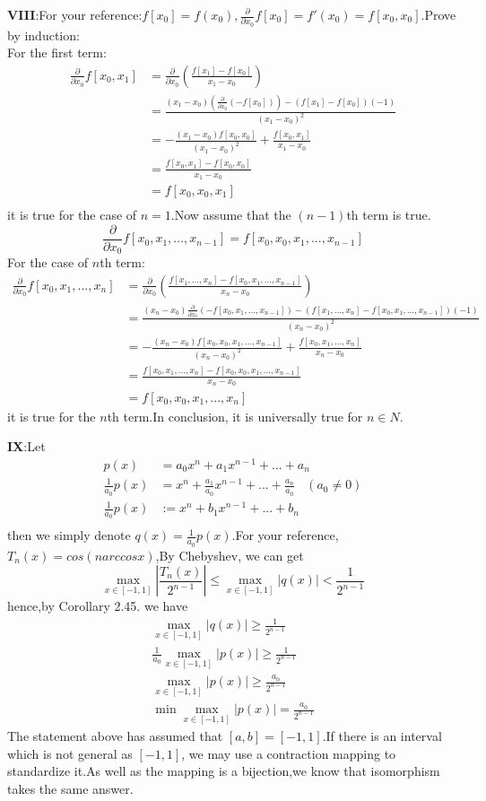 \documentclass{ctexart}
\begin{document}
\textbf{VIII}:For your reference:$f[x_0]=f(x_0),\frac{\partial}{\partial x_0}f[x_0]=f'(x_0)=f[x_0,x_0]$.Prove by induction:\\
For the first term:
\begin{align*}
    \frac{\partial}{\partial x_0}f[x_0,x_1]&=\frac{\partial}{\partial x_0}(\frac{f[x_1]-f[x_0]}{x_1-x_0})\\
    &=\frac{(x_1-x_0)(\frac{\partial}{\partial x_0}(-f[x_0]))-(f[x_1]-f[x_0])(-1)}{(x_1-x_0)^2}\\
    &=-\frac{(x_1-x_0)f[x_0,x_0]}{(x_1-x_0)^2}+\frac{f[x_0,x_1]}{x_1-x_0}\\
    &=\frac{f[x_0,x_1]-f[x_0,x_0]}{x_1-x_0}\\
    &=f[x_0,x_0,x_1]\\
\end{align*}
it is true for the case of $n=1$.Now assume that the $(n-1)$th term is true.
$$\frac{\partial}{\partial x_0}f[x_0,x_1,...,x_{n-1}]=f[x_0,x_0,x_1,...,x_{n-1}]$$
For the case of $n$th term:
\begin{align*}
    \frac{\partial}{\partial x_0}f[x_0,x_1,...,x_n]&=\frac{\partial}{\partial x_0}(\frac{f[x_1,...,x_n]-f[x_0,x_1,...,x_{n-1}]}{x_n-x_0})\\
    &=\frac{(x_n-x_0)\frac{\partial}{\partial x_0}(-f[x_0,x_1,...,x_{n-1}])-(f[x_1,...,x_n]-f[x_0,x_1,...,x_{n-1}])(-1)}{(x_n-x_0)^2}\\
    &=-\frac{(x_n-x_0)f[x_0,x_0,x_1,...,x_{n-1}]}{(x_n-x_0)^2}+\frac{f[x_0,x_1,...,x_n]}{x_n-x_0}\\
    &=\frac{f[x_0,x_1,...,x_n]-f[x_0,x_0,x_1,...,x_{n-1}]}{x_n-x_0}\\
    &=f[x_0,x_0,x_1,...,x_n]
\end{align*}
it is true for the $n$th term.In conclusion, it is universally true for $n \in N$.

\textbf{IX}:Let 
\begin{align*}
    p(x)&=a_0x^n+a_1x^{n-1}+...+a_n\\
    \frac{1}{a_0}p(x)&=x^n+\frac{a_1}{a_0}x^{n-1}+...+\frac{a_n}{a_0} \>\>\>\>(a_0 \neq 0)\\
    \frac{1}{a_0}p(x)&:=x^n+b_1x^{n-1}+...+b_n\\
\end{align*}
then we simply denote $q(x)=\frac{1}{a_0}p(x)$.For your reference, $T_n(x)=cos(n arccos x)$,By Chebyshev, we can get 
$$\max_{x \in [-1,1]} |\frac{T_n(x)}{2^{n-1}}| \leq \max_{x \in [-1,1]} |q(x)|<\frac{1}{2^{n-1}}$$
hence,by Corollary 2.45. we have 
\begin{align*}
    \max_{x \in [-1,1]} |q(x)| \geq \frac{1}{2^{n-1}}\\
    \frac{1}{a_0}\max_{x \in [-1,1]} |p(x)| \geq \frac{1}{2^{n-1}}\\
    \max_{x \in [-1,1]} |p(x)| \geq \frac{a_0}{2^{n-1}}\\
    \min \max_{x \in [-1,1]} |p(x)|=\frac{a_0}{2^{n-1}}
\end{align*}
The statement above has assumed that $[a,b]=[-1,1]$.If there is an interval which is not general as $[-1,1]$, we may use a contraction mapping to standardize it.As well as the mapping is a bijection,we know that isomorphism takes the same answer.
\\
\end{document}
